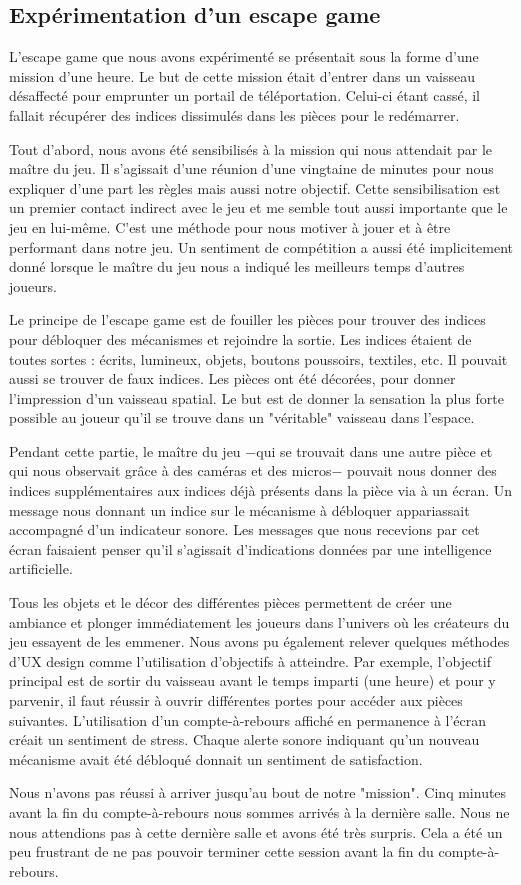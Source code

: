 \documentclass[11pt]{article}
\begin{document}
	\subsection{Expérimentation d'un escape game}\label{sec:expescape}
		L'escape game que nous avons expérimenté se présentait sous la forme d'une mission d'une heure.
		Le but de cette mission était d'entrer dans un vaisseau désaffecté pour emprunter un portail de téléportation.
		Celui-ci étant cassé, il fallait récupérer des indices dissimulés dans les pièces pour le redémarrer.\par
		Tout d'abord, nous avons été sensibilisés à la mission qui nous attendait par le maître du jeu.
		Il s'agissait d'une réunion d'une vingtaine de minutes pour nous expliquer d'une part les règles mais aussi notre objectif.
		Cette sensibilisation est un premier contact indirect avec le jeu et me semble tout aussi importante que le jeu en lui-même.
		C'est une méthode pour nous motiver à jouer et à être performant dans notre jeu.
		Un sentiment de compétition a aussi été implicitement donné lorsque le maître du jeu nous a indiqué les meilleurs temps d'autres joueurs.\par
		Le principe de l'escape game est de fouiller les pièces pour trouver des indices pour débloquer des mécanismes et rejoindre la sortie.
		Les indices étaient de toutes sortes : écrits, lumineux, objets, boutons poussoirs, textiles, etc.
		Il pouvait aussi se trouver de faux indices.
		Les pièces ont été décorées, pour donner l'impression d'un vaisseau spatial.
		Le but est de donner la sensation la plus forte possible au joueur qu'il se trouve dans un "véritable" vaisseau dans l'espace.\par
		Pendant cette partie, le maître du jeu $-$qui se trouvait dans une autre pièce et qui nous observait grâce à des caméras et des micros$-$ pouvait nous donner des indices supplémentaires aux indices déjà présents dans la pièce via à un écran.
		Un message nous donnant un indice sur le mécanisme à débloquer appariassait accompagné d'un indicateur sonore.
		Les messages que nous recevions par cet écran faisaient penser qu'il s'agissait d'indications données par une intelligence artificielle.\par
		Tous les objets et le décor des différentes pièces permettent de créer une ambiance et plonger immédiatement les joueurs dans l'univers où les créateurs du jeu essayent de les emmener.
		Nous avons pu également relever quelques méthodes d'UX design comme l'utilisation d'objectifs à atteindre.
		Par exemple, l'objectif principal est de sortir du vaisseau avant le temps imparti (une heure) et pour y parvenir, il faut réussir à ouvrir différentes portes pour accéder aux pièces suivantes.
		L'utilisation d'un compte-à-rebours affiché en permanence à l'écran créait un sentiment de stress.
		Chaque alerte sonore indiquant qu'un nouveau mécanisme avait été débloqué donnait un sentiment de satisfaction.\par
		Nous n'avons pas réussi à arriver jusqu'au bout de notre "mission". Cinq minutes avant la fin du compte-à-rebours nous sommes arrivés à la dernière salle.
		Nous ne nous attendions pas à cette dernière salle et avons été très surpris.
		Cela a été un peu frustrant de ne pas pouvoir terminer cette session avant la fin du compte-à-rebours.
\end{document}
